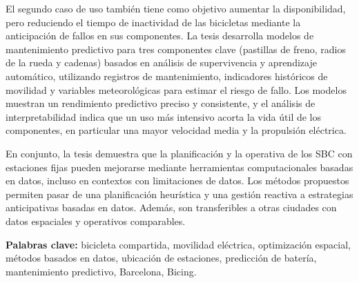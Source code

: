 \begin{spanishabstract}
El segundo caso de uso también tiene como objetivo aumentar la disponibilidad, pero reduciendo el tiempo de inactividad de las bicicletas mediante la anticipación de fallos en sus componentes. La tesis desarrolla modelos de mantenimiento predictivo para tres componentes clave (pastillas de freno, radios de la rueda y cadenas) basados en análisis de supervivencia y aprendizaje automático, utilizando registros de mantenimiento, indicadores históricos de movilidad y variables meteorológicas para estimar el riesgo de fallo. Los modelos muestran un rendimiento predictivo preciso y consistente, y el análisis de interpretabilidad indica que un uso más intensivo acorta la vida útil de los componentes, en particular una mayor velocidad media y la propulsión eléctrica.

En conjunto, la tesis demuestra que la planificación y la operativa de los SBC con estaciones fijas pueden mejorarse mediante herramientas computacionales basadas en datos, incluso en contextos con limitaciones de datos. Los métodos propuestos permiten pasar de una planificación heurística y una gestión reactiva a estrategias anticipativas basadas en datos. Además, son transferibles a otras ciudades con datos espaciales y operativos comparables.

\textbf{Palabras clave:} bicicleta compartida, movilidad eléctrica, optimización espacial, métodos basados en datos, ubicación de estaciones, predicción de batería, mantenimiento predictivo, Barcelona, Bicing.

\end{spanishabstract}
